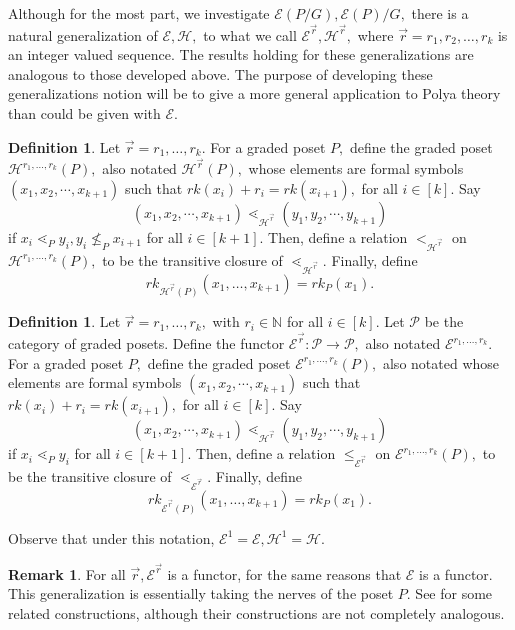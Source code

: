 \documentclass[10 pt]{amsart}
\theoremstyle{plain}
\theoremstyle{definition}
\newtheorem{defn}[thm]{Definition}
\newtheorem{rem}[thm]{Remark}
\theoremstyle{remark}
\numberwithin{equation}{section}
\newcommand\BN{{\mathbb N}}
\renewcommand{\vec}[1]{\overrightarrow{#1}}
\begin{document}
Although for the most part, we investigate \linebreak
$\mathcal E(P/G),\mathcal E(P)/G,$ there is a natural generalization of $\mathcal E,\mathcal H,$ to what we call $\mathcal E^{\vec r},\mathcal H^{\vec r},$ where $\vec r = r_1,r_2,\ldots, r_k$ is an integer valued sequence. The results holding for these generalizations are analogous to those developed above. The purpose of developing these generalizations notion will be to give a more general application to Polya theory than could be given with $\mathcal E.$

\begin{defn}
Let $\vec r = r_1,\ldots,r_k.$ For a graded poset $P,$ define the graded poset $\mathcal H^{r_1,\ldots, r_k}(P),$ also notated $\mathcal H^{\vec r}(P),$ whose elements are formal symbols $(x_1, x_2, \cdots, x_{k+1})$ such that $rk(x_i)+r_i = rk(x_{i+1}),$ for all $i \in [k].$ Say 
$$(x_1, x_2, \cdots, x_{k+1})\lessdot_{\mathcal H^{\vec r}} (y_1, y_2, \cdots, y_{k+1})$$
if $x_i \lessdot_P y_i,y_{i} \not \leq_P x_{i+1}$ for all $i \in [k+1].$ Then, define a relation $<_{\mathcal H^{\vec r}}$ on $\mathcal H^{r_1,\ldots, r_k}(P),$ to be the transitive closure of $\lessdot_{\mathcal H^{\vec r}}.$ Finally, define 
$$rk_{\mathcal H^{\vec r}(P)}(x_1,\ldots, x_{k+1}) = rk_P(x_1).$$
\end{defn}

\begin{defn}
Let $\vec r = r_1,\ldots,r_k,$ with $r_i \in \BN$ for all $i \in [k].$ Let $\mathcal P$ be the category of graded posets. Define the functor $\mathcal E^{\vec r}:\mathcal P \rightarrow \mathcal P,$ also notated $\mathcal E^{r_1,\ldots, r_k}.$ For a graded poset $P,$ define the graded poset $\mathcal E^{r_1,\ldots, r_k}(P),$ also notated whose elements are formal symbols $(x_1, x_2, \cdots, x_{k+1})$ such that $rk(x_i)+r_i = rk(x_{i+1}),$ for all $i \in [k].$ Say 
$$(x_1, x_2, \cdots, x_{k+1})\lessdot_{\mathcal H^{\vec r}} (y_1, y_2, \cdots , y_{k+1})$$ if $x_i \lessdot_P y_i$ for all $i \in [k+1]$. Then, define a relation $\leq_{\mathcal E^{\vec r}}$ on $\mathcal E^{r_1,\ldots, r_k}(P),$ to be the transitive closure of $\lessdot_{\mathcal E^{\vec r}}.$ Finally, define 
$$rk_{\mathcal E^{\vec r}(P)}(x_1,\ldots, x_{k+1}) = rk_P(x_1).$$
\end{defn}

Observe that under this notation, $\mathcal E^1 = \mathcal E, \mathcal H^1 = \mathcal H.$

\begin{rem}
For all $\vec r,\mathcal E^{\vec r}$ is a functor, for the same reasons that $\mathcal E$ is a functor. This generalization is essentially taking the nerves of the poset $P.$ See \cite{babson} for some related constructions, although their constructions are not completely analogous.
\end{rem}
\end{document}
